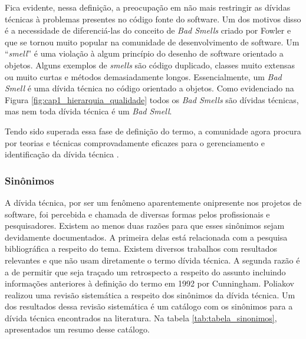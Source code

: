 
Fica evidente, nessa definição, a preocupação em não mais restringir as dívidas técnicas à problemas  presentes no código fonte do software. Um dos motivos disso é a necessidade de diferenciá-las do conceito de \textit{Bad Smells} criado por Fowler\cite{fowler2009refactoring} e que se tornou muito popular na comunidade de desenvolvimento de software\cite{olbrich2009evolution}. Um ``\textit{smell}'' é uma violação à algum princípio do desenho de software orientado a objetos. Alguns exemplos de \textit{smells} são código duplicado, classes muito extensas ou muito curtas e métodos demasiadamente longos\cite{van2002java}. Essencialmente, um \textit{Bad Smell} é uma dívida técnica no código orientado a objetos\cite{poliakov2015systematic}. Como evidenciado na Figura \ref{fig:cap1_hierarquia_qualidade} todos os \textit{Bad Smells} são dívidas técnicas, mas nem toda dívida técnica é um \textit{Bad Smell}.


Tendo sido superada essa fase de definição do termo, a comunidade agora procura por teorias e técnicas comprovadamente eficazes para o gerenciamento e identificação da dívida técnica \cite{falessi2014technical}.





\subsubsection{Sinônimos}

A dívida técnica, por ser um fenômeno aparentemente onipresente nos projetos de software\cite{lim2012balancing,brown2010managing}, foi percebida e chamada de diversas formas pelos profissionais e pesquisadores. Existem ao menos duas razões para que esses sinônimos sejam devidamente documentados. A primeira delas está relacionada com a pesquisa bibliográfica a respeito do tema. Existem diversos trabalhos com resultados relevantes e que não usam diretamente o termo dívida técnica\cite{fowler2018refactoring,lanning1994modeling,lindgren2012bridging,smit2011code}. A segunda razão é a de permitir que seja traçado um retrospecto a respeito do assunto incluindo informações anteriores à definição do termo em 1992 por Cunningham\cite{cunningham1993wycash}. Poliakov realizou uma revisão sistemática a respeito dos sinônimos da dívida técnica\cite{poliakov2015systematic}. Um dos resultados dessa revisão sistemática é um catálogo com os sinônimos para a dívida técnica encontrados na literatura. Na tabela \ref{tab:tabela_sinonimos}, apresentados um resumo desse catálogo.

